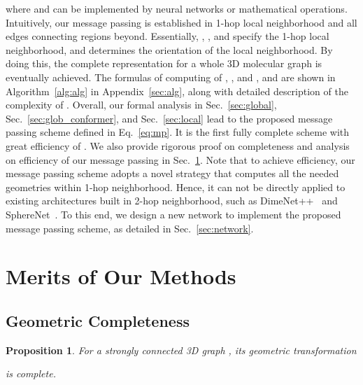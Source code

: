 \documentclass{article}
\newtheorem{prop}{Proposition}
\begin{document}
where  and  can be implemented by neural networks or mathematical operations.
Intuitively, our message passing is established in 1-hop local neighborhood and all edges connecting regions beyond.
Essentially, , , and 
specify the 1-hop local neighborhood, and
 determines the orientation of the 
local neighborhood. By doing this, the complete representation 
for a whole 3D molecular graph is eventually achieved.
The formulas of computing of , , and , and 
are shown in Algorithm~\ref{alg:alg} in Appendix~\ref{sec:alg},
along with detailed description of the
complexity of .
\textcolor{COLOR}{
Overall, our formal analysis in Sec.~\ref{sec:global}, Sec.~\ref{sec:glob_conformer}, and Sec.~\ref{sec:local}
lead to the proposed message passing scheme defined in Eq.~\ref{eq:mp}.
It is the first fully complete scheme with great efficiency of .
We also provide rigorous proof on completeness and analysis on efficiency of our message passing in Sec.~\ref{sec:merits}.
Note that to achieve efficiency, our message passing scheme adopts a novel strategy that computes all the needed geometries within 1-hop neighborhood.
Hence, it can not be directly applied to existing architectures built in 2-hop neighborhood, such as DimeNet++~\cite{klicpera_dimenetpp_2020} and SphereNet~\cite{liu2022spherical}.
To this end, we design a new network to implement the proposed message passing scheme, as detailed in Sec.~\ref{sec:network}.
}


\section{Merits of Our Methods} \label{sec:merits}

\subsection{Geometric Completeness}  \label{sec:comp}


\begin{prop}
For a strongly connected 3D graph , its geometric transformation

is complete.
\label{theorem1}
\end{prop}
\end{document}
